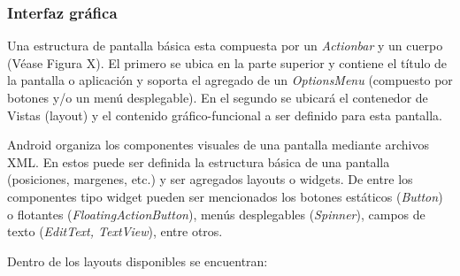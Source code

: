     \subsubsection{Interfaz gráfica}
    
    \par Una estructura de pantalla básica esta compuesta por un \textit{Actionbar} y un cuerpo (Véase Figura X). El primero se ubica en la parte superior y contiene el título de la pantalla o aplicación y soporta el agregado de un \textit{OptionsMenu} (compuesto por botones y/o un menú desplegable). En el segundo se ubicará el contenedor de Vistas (layout) y el contenido gráfico-funcional a ser definido para esta pantalla.
    
    \par Android organiza los componentes visuales de una pantalla mediante archivos XML. En estos puede ser definida la estructura básica de una pantalla (posiciones, margenes, etc.) y ser agregados layouts o widgets. De entre los componentes tipo widget pueden ser mencionados los botones estáticos (\textit{Button}) o flotantes (\textit{FloatingActionButton}), menús desplegables (\textit{Spinner}), campos de texto (\textit{EditText, TextView}), entre otros.
    
    \par Dentro de los layouts disponibles se encuentran:
    
